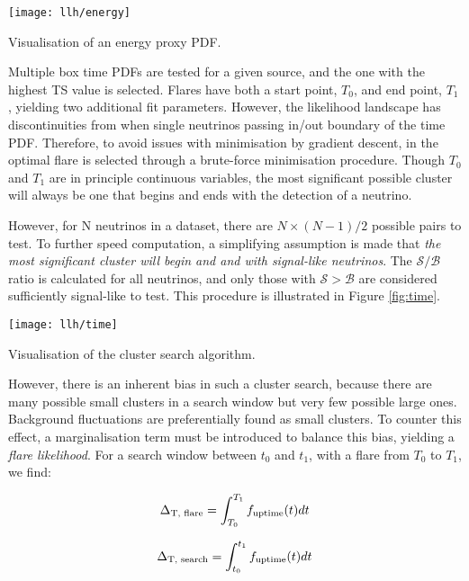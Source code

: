 \begin{marginfigure}
	\centering \texttt{[image: llh/energy]}
	\caption{Visualisation of an energy proxy PDF.}
	\label{fig:energy}
\end{marginfigure}

Multiple box time PDFs are tested for a given source, and the one with the highest TS value is selected. Flares have both a start point, $T_{0}$, and end point, $T_{1}$, yielding two additional fit parameters. However, the likelihood landscape has discontinuities from when single neutrinos passing in/out boundary of the time PDF. Therefore, to avoid issues with minimisation by gradient descent, in  \flarestack{} the optimal flare is selected through a brute-force minimisation procedure. Though $T_{0}$ and $T_{1}$ are in principle continuous variables, the most significant possible cluster will always be one that begins and ends with the detection of a neutrino.

However, for N neutrinos in a dataset, there are $N \times (N-1)/2$ possible pairs to test. To further speed computation, a simplifying assumption is made that \emph{the most significant cluster will begin and and with signal-like neutrinos}. The $\mathcal{S}/\mathcal{B}$ ratio is calculated for all neutrinos, and only those with $\mathcal{S} > \mathcal{B}$ are considered sufficiently signal-like to test. This procedure is illustrated in Figure \ref{fig:time}.

\begin{marginfigure}
	\centering \texttt{[image: llh/time]}
	\caption{Visualisation of the cluster search algorithm.}
	\label{fig:time}
\end{marginfigure}

However, there is an inherent bias in such a cluster search, because there are many possible small clusters in a search window but very few possible large ones. Background fluctuations are preferentially found as small clusters. To counter this effect, a marginalisation term must be introduced to balance this bias, yielding a \emph{flare likelihood}. For a search window between $t_{0}$ and $t_{1}$, with a flare from $T_{0}$ to $T_{1}$, we find:

\begin{equation}
\Delta_{\textup{T, flare}} = \int_{T_{0}}^{T_{1}}f_{\textup{uptime}}(t) dt
\end{equation}

\begin{equation}
\Delta_{\textup{T, search}} = \int_{t_{0}}^{t_{1}}f_{\textup{uptime}}(t) dt
\end{equation}

